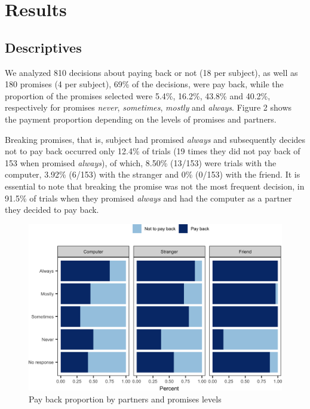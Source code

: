 \documentclass[12pt,]{article}
\begin{document}
\hypertarget{results}{%
\section{Results}\label{results}}

\hypertarget{descriptives}{%
\subsection{Descriptives}\label{descriptives}}

We analyzed 810 decisions about paying back or not (18 per subject), as
well as 180 promises (4 per subject), 69\% of the decisions, were pay
back, while the proportion of the promises selected were 5.4\%, 16.2\%,
43.8\% and 40.2\%, respectively for promises \emph{never},
\emph{sometimes}, \emph{mostly} and \emph{always}. Figure 2 shows the
payment proportion depending on the levels of promises and partners.

Breaking promises, that is, subject had promised \emph{always} and
subsequently decides not to pay back occurred only 12.4\% of trials (19
times they did not pay back of 153 when promised \emph{always}), of
which, 8.50\% (13/153) were trials with the computer, 3.92\% (6/153)
with the stranger and 0\% (0/153) with the friend. It is essential to
note that breaking the promise was not the most frequent decision, in
91.5\% of trials when they promised \emph{always} and had the computer
as a partner they decided to pay back.

\begin{figure}

{\centering \includegraphics[width=0.8\linewidth]{article_english_files/figure-latex/fig2-1} 

}

\caption{Pay back proportion by partners and promises levels}\label{fig:fig2}
\end{figure}
\end{document}
